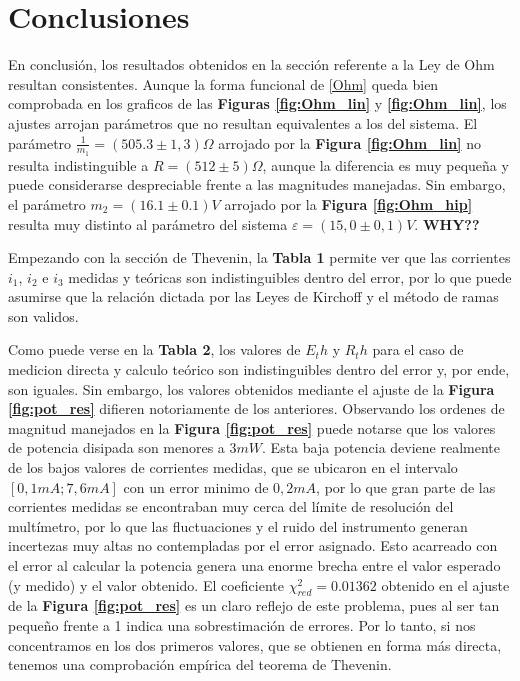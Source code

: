 \documentclass[11pt,a4paper]{article}
\begin{document}

\section{Conclusiones}
\label{sec:conclusiones}

En conclusión, los resultados obtenidos en la sección referente a la Ley de Ohm resultan consistentes. Aunque la forma funcional de \eqref{Ohm} queda bien comprobada en los graficos de las \textbf{Figuras \ref{fig:Ohm_lin}} y \textbf{\ref{fig:Ohm_lin}}, los ajustes arrojan parámetros que no resultan equivalentes a los del sistema. El parámetro $\frac{1}{m_1} = (505.3 \pm 1,3)\Omega$ arrojado por la \textbf{Figura \ref{fig:Ohm_lin}} no resulta indistinguible a $R = (512 \pm 5)\Omega$, aunque la diferencia es muy pequeña y puede considerarse despreciable frente a las magnitudes manejadas. Sin embargo, el parámetro $m_2 = (16.1\pm0.1)V$ arrojado por la \textbf{Figura \ref{fig:Ohm_hip}} resulta muy distinto al parámetro del sistema $\varepsilon = (15,0 \pm 0,1)V$. \textbf{WHY??}

Empezando con la sección de Thevenin, la \textbf{Tabla 1} permite ver que las corrientes $i_1$, $i_2$ e $i_3$ medidas y teóricas son indistinguibles dentro del error, por lo que puede asumirse que la relación dictada por las Leyes de Kirchoff y el método de ramas son validos. 

Como puede verse en la \textbf{Tabla 2}, los valores de $E_th$ y $R_th$ para el caso de medicion directa y calculo teórico son indistinguibles dentro del error y, por ende, son iguales. Sin embargo, los valores obtenidos mediante el ajuste de la \textbf{Figura \ref{fig:pot_res}} difieren notoriamente de los anteriores. Observando los ordenes de magnitud manejados en la \textbf{Figura \ref{fig:pot_res}} puede notarse que los valores de potencia disipada son menores a $3mW$. Esta baja potencia deviene realmente de los bajos valores de corrientes medidas, que se ubicaron en el intervalo $[0,1mA;7,6mA]$ con un error minimo de $0,2mA$, por lo que gran parte de las corrientes medidas se encontraban muy cerca del límite de resolución del multímetro, por lo que las fluctuaciones y el ruido del instrumento generan incertezas muy altas no contempladas por el error asignado. Esto acarreado con el error al calcular la potencia genera una enorme brecha entre el valor esperado (y medido) y el valor obtenido. El coeficiente $\chi_{red}^{2} = 0.01362$ obtenido en el ajuste de la \textbf{Figura \ref{fig:pot_res}} es un claro reflejo de este problema, pues al ser tan pequeño frente a 1 indica una sobrestimación de errores. Por lo tanto, si nos concentramos en los dos primeros valores, que se obtienen en forma más directa, tenemos una comprobación empírica del teorema de Thevenin. 
\end{document}
